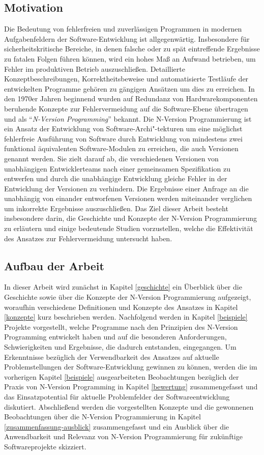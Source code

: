 \subsection{Motivation}\label{motivation}

Die Bedeutung von fehlerfreien und zuverlässigen Programmen in modernen Aufgabenfeldern der Software-Entwicklung ist allgegenwärtig.
Insbesondere für sicherheitskritische Bereiche, in denen falsche oder zu spät eintreffende Ergebnisse zu fatalen Folgen führen können, wird ein hohes Maß an Aufwand betrieben, um Fehler im produktiven Betrieb auszuschließen.
Detaillierte Konzeptbeschreibungen, Korrektheitsbeweise und automatisierte Testläufe der entwickelten Programme gehören zu gängigen Ansätzen um dies zu erreichen.
In den 1970er Jahren beginnend wurden auf Redundanz von Hardwarekomponenten beruhende Konzepte zur Fehlervermeidung auf die Software-Ebene übertragen und als \enquote{\emph{N-Version Programming}} \cite{Chen1978} bekannt.
Die N-Version Programmierung ist ein Ansatz der Entwicklung von Software-Archi"-tekturen um eine möglichst fehlerfreie Ausführung von Software durch Entwicklung von mindestens zwei funktional äquivalenten Software-Modulen zu erreichen, die auch Versionen genannt werden.
Sie zielt darauf ab, die verschiedenen Versionen von unabhängigen Entwicklerteams nach einer gemeinsamen Spezifikation zu entwerfen und durch die unabhängige Entwicklung gleiche Fehler in der Entwicklung der Versionen zu verhindern.
Die Ergebnisse einer Anfrage an die unabhängig von einander entworfenen Versionen werden miteinander verglichen um inkorrekte Ergebnisse auszuschließen.
Das Ziel dieser Arbeit besteht insbesondere darin, die Geschichte und Konzepte der N-Version Programmierung zu erläutern und einige bedeutende Studien vorzustellen, welche die Effektivität des Ansatzes zur Fehlervermeidung untersucht haben.


\subsection{Aufbau der Arbeit}\label{aufbau}

In dieser Arbeit wird zunächst in Kapitel \ref{geschichte} ein Überblick über die Geschichte sowie über die Konzepte der N-Version Programmierung aufgezeigt, woraufhin verschiedene Definitionen und Konzepte des Ansatzes in Kapitel \ref{konzepte} kurz beschrieben werden. Nachfolgend werden in Kapitel \ref{beispiele} Projekte vorgestellt, welche Programme nach den Prinzipien des N-Version Programming entwickelt haben und auf die besonderen Anforderungen, Schwierigkeiten und Ergebnisse, die dadurch entstanden, eingegangen.
Um Erkenntnisse bezüglich der Verwendbarkeit des Ansatzes auf aktuelle Problemstellungen der Software-Entwicklung gewinnen zu können, werden die im vorherigen Kapitel \ref{beispiele} ausgearbeiteten Beobachtungen bezüglich der Praxis von N-Version Programming in Kapitel \ref{bewertung} zusammengefasst und das Einsatzpotential für aktuelle Problemfelder der Softwareentwicklung diskutiert.
Abschließend werden die vorgestellten Konzepte und die gewonnenen Beobachtungen über die N-Version Programmierung in Kapitel \ref{zusammenfassung-ausblick} zusammengefasst und ein Ausblick über die Anwendbarkeit und Relevanz von N-Version Programmierung für zukünftige Softwareprojekte skizziert.
